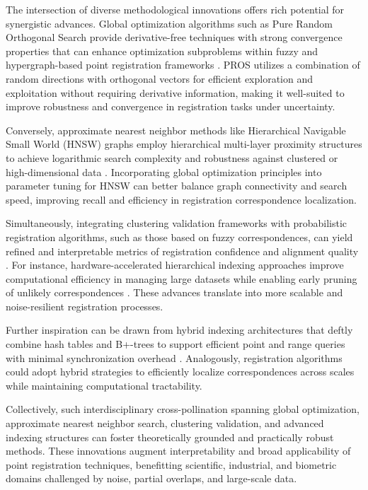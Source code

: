 \documentclass[sigconf]{acmart}
\begin{document}
The intersection of diverse methodological innovations offers rich potential for synergistic advances. Global optimization algorithms such as Pure Random Orthogonal Search provide derivative-free techniques with strong convergence properties that can enhance optimization subproblems within fuzzy and hypergraph-based point registration frameworks \cite{ref8,ref6}. PROS utilizes a combination of random directions with orthogonal vectors for efficient exploration and exploitation without requiring derivative information, making it well-suited to improve robustness and convergence in registration tasks under uncertainty.

Conversely, approximate nearest neighbor methods like Hierarchical Navigable Small World (HNSW) graphs employ hierarchical multi-layer proximity structures to achieve logarithmic search complexity and robustness against clustered or high-dimensional data \cite{ref4}. Incorporating global optimization principles into parameter tuning for HNSW can better balance graph connectivity and search speed, improving recall and efficiency in registration correspondence localization.

Simultaneously, integrating clustering validation frameworks with probabilistic registration algorithms, such as those based on fuzzy correspondences, can yield refined and interpretable metrics of registration confidence and alignment quality \cite{ref24,ref5}. For instance, hardware-accelerated hierarchical indexing approaches improve computational efficiency in managing large datasets while enabling early pruning of unlikely correspondences \cite{ref24}. These advances translate into more scalable and noise-resilient registration processes.

Further inspiration can be drawn from hybrid indexing architectures that deftly combine hash tables and B+-trees to support efficient point and range queries with minimal synchronization overhead \cite{ref35}. Analogously, registration algorithms could adopt hybrid strategies to efficiently localize correspondences across scales while maintaining computational tractability.

Collectively, such interdisciplinary cross-pollination spanning global optimization, approximate nearest neighbor search, clustering validation, and advanced indexing structures can foster theoretically grounded and practically robust methods. These innovations augment interpretability and broad applicability of point registration techniques, benefitting scientific, industrial, and biometric domains challenged by noise, partial overlaps, and large-scale data.
\end{document}
